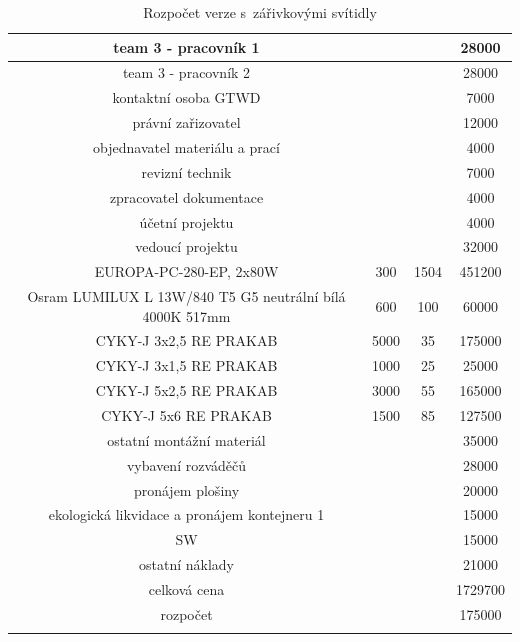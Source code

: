 \documentclass[a4paper, twoside, 11pt]{article}
\begin{document}
\begin{table}[H]
\begin{tabular}{ !{\vrule width 2pt} c | c | c | c  !{\vrule width 2pt}}
				team 3 - pracovník 1 && 28000\\ \hline
				team 3 - pracovník 2 && 28000\\ \hline
				kontaktní osoba GTWD && 7000\\ \hline
				právní zařizovatel && 12000\\ \hline
				objednavatel materiálu a prací && 4000\\ \hline
				revizní technik && 7000\\ \hline
				zpracovatel dokumentace && 4000\\ \hline
				účetní projektu && 4000\\ \hline
				vedoucí projektu && 32000\\ \hline
				EUROPA-PC-280-EP, 2x80W & 300 & 1504 & 451200\\ \hline
				Osram LUMILUX L 13W/840 T5 G5 neutrální bílá 4000K 517mm & 600 & 100 & 60000\\ \hline
				CYKY-J 3x2,5 RE PRAKAB & 5000 & 35 & 175000\\ \hline
				CYKY-J 3x1,5 RE PRAKAB & 1000 & 25 & 25000\\ \hline
				CYKY-J 5x2,5 RE PRAKAB & 3000 & 55 & 165000\\ \hline
				CYKY-J 5x6 RE PRAKAB & 1500 & 85 & 127500\\ \hline
				ostatní montážní materiál && 35000\\ \hline
				vybavení rozváděčů && 28000\\ \hline
				pronájem plošiny && 20000\\ \hline
				ekologická likvidace a pronájem kontejneru 1 && 15000\\ \hline
				SW && 15000\\ \hline
				ostatní náklady && 21000\\ 
				celková cena && 1729700\\ \hline
				rozpočet && 175000\\ 
				
				\end{tabular}
			\caption{Rozpočet verze s~zářivkovými svítidly}
			\end{table}
		
\end{document}
